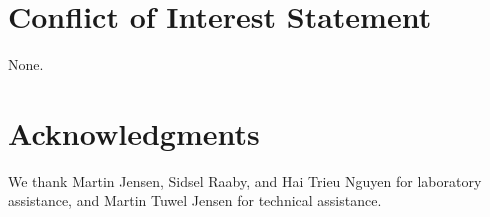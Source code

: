 \documentclass[preprint,5p,times,11pt]{elsarticle}
\begin{document}
\section{Conflict of Interest Statement}
None.



\section{Acknowledgments}
We thank Martin Jensen, Sidsel Raaby, and Hai Trieu Nguyen for laboratory assistance, and Martin Tuwel Jensen for technical assistance.





 




%
\end{document}
